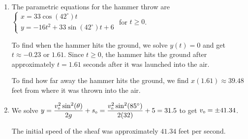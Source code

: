 \begin{enumerate} 
\setcounter{enumi}{\value{HW}}

\item  The parametric equations for the hammer throw are ${\displaystyle \left\{ \begin{array}{l} x = 33 \cos(42^{\circ}) t \\ [4pt] y =-16t^2 +  33 \sin(42^{\circ}) t + 6 \end{array} \right.}$ for $t \geq 0$.  

\smallskip

To find when the hammer hits the ground, we solve $y(t) = 0$ and get $t \approx -0.23$ or $1.61$.  Since $t \geq 0$, the hammer hits the ground after approximately $t = 1.61$ seconds after it was launched into the air.  

\smallskip

To find how far away the hammer hits the ground, we find $x(1.61) \approx 39.48$ feet from where it was thrown into the air.

\addtocounter{enumi}{1}

\item  We solve $y = \dfrac{v_{\text{\tiny$0$}}^2 \sin^{2}(\theta)}{2g} + s_{\text{\tiny $0$}}  = \dfrac{v_{\text{\tiny$0$}}^2 \sin^{2}(85^{\circ})}{2(32)} + 5 = 31.5$ to get $v_{\text{\tiny$0$}} = \pm 41.34$.  

\smallskip

The initial speed of the sheaf was approximately $41.34$ feet per second.

\setcounter{HW}{\value{enumi}}
\end{enumerate}

